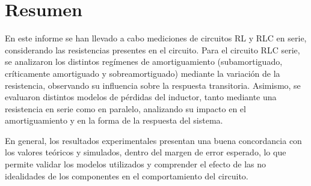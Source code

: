 \section{Resumen}
En este informe se han llevado a cabo mediciones de circuitos RL y RLC en serie, considerando las resistencias presentes en el circuito. Para el circuito RLC serie, se analizaron los distintos regímenes de amortiguamiento (subamortiguado, críticamente amortiguado y sobreamortiguado) mediante la variación de la resistencia, observando su influencia sobre la respuesta transitoria. Asimismo, se evaluaron distintos modelos de pérdidas del inductor, tanto mediante una resistencia en serie como en paralelo, analizando su impacto en el amortiguamiento y en la forma de la respuesta del sistema.

En general, los resultados experimentales presentan una buena concordancia con los valores teóricos y simulados, dentro del margen de error esperado, lo que permite validar los modelos utilizados y comprender el efecto de las no idealidades de los componentes en el comportamiento del circuito.
\newpage